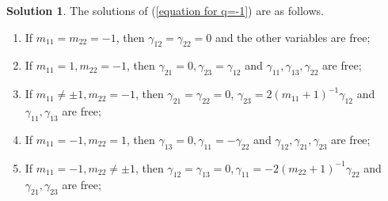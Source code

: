 \documentclass[a4paper,10pt]{amsart}
\theoremstyle{definition}
\newtheorem{solution}[theorem]{Solution}
\numberwithin{equation}{section}
\begin{document}
\begin{solution}\label{solution: q=-1}
The solutions of (\ref{equation for q=-1}) are as follows.
\begin{enumerate}
\item If $m_{11}=m_{22}=-1$, then $\gamma_{12}=\gamma_{22}=0$ and the other variables are free;%

\item If $m_{11}=1,m_{22}=-1$, then $\gamma_{21}=0,\gamma_{23}=\gamma_{12}$ and  $\gamma_{11},\gamma_{13},\gamma_{22}$ are free;%


\item If $m_{11}\neq \pm1,m_{22}=-1$, then $\gamma_{21}=\gamma_{22}=0$, $\gamma_{23}=2(m_{11}+1)^{-1}\gamma_{12}$ and $\gamma_{11},\gamma_{13}$ are free;%

\item If $m_{11}=-1,m_{22}=1$, then $\gamma_{13}=0,\gamma_{11}=-\gamma_{22}$ and  $\gamma_{12},\gamma_{21},\gamma_{23}$ are free;%

%
\item  If $m_{11}=-1,m_{22}\neq \pm 1$, then $\gamma_{12}=\gamma_{13}=0,\gamma_{11}=-2(m_{22}+1)^{-1}\gamma_{22}$ and $\gamma_{21},\gamma_{23}$ are free;%



\end{enumerate}
\end{solution}
\end{document}
